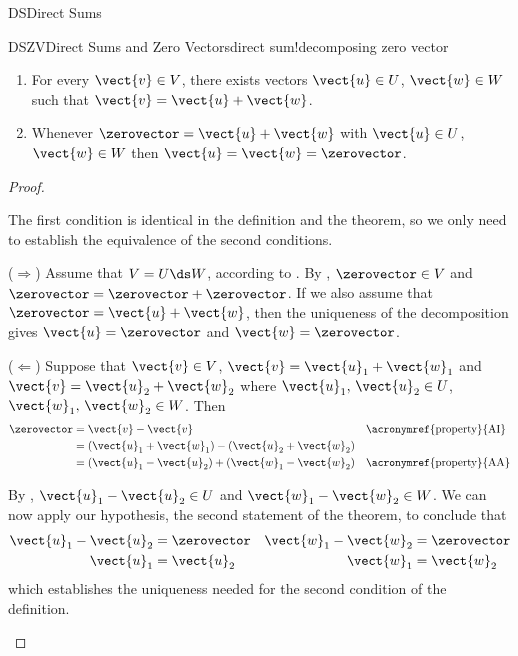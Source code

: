 \begin{subsect}{DS}{Direct Sums}
\begin{theorem}{DSZV}{Direct Sums and Zero Vectors}{direct sum!decomposing zero vector}
\begin{para}
\begin{enumerate}
\item  For every $\vect{v}\in V$, there exists vectors $\vect{u}\in U$, $\vect{w}\in W$ such that $\vect{v}=\vect{u}+\vect{w}$.
%
\item Whenever $\zerovector=\vect{u}+\vect{w}$ with $\vect{u}\in U$, $\vect{w}\in W$ then $\vect{u}=\vect{w}=\zerovector$.
\end{enumerate}
\end{para}
\end{theorem}
%
\begin{proof}
\begin{para}The first condition is identical in the definition and the theorem, so we only need to establish the equivalence of the second conditions.\end{para}
%
\begin{para}($\Rightarrow$)
Assume that $V=U\ds W$, according to .   By , $\zerovector\in V$ and $\zerovector=\zerovector+\zerovector$.  If we also assume that $\zerovector=\vect{u}+\vect{w}$, then the uniqueness of the decomposition gives $\vect{u}=\zerovector$ and $\vect{w}=\zerovector$.\end{para}
%
\begin{para}($\Leftarrow$)
Suppose that $\vect{v}\in V$, $\vect{v}=\vect{u}_1+\vect{w}_1$ and $\vect{v}=\vect{u}_2+\vect{w}_2$ where $\vect{u}_1,\,\vect{u}_2\in U$, $\vect{w}_1,\,\vect{w}_2\in W$.  Then
%
\begin{align*}
\zerovector
&=\vect{v}-\vect{v}&&\text{\acronymref{property}{AI}}\\
&=\left(\vect{u}_1+\vect{w}_1\right)-\left(\vect{u}_2+\vect{w}_2\right)\\
&=\left(\vect{u}_1-\vect{u}_2\right)+\left(\vect{w}_1-\vect{w}_2\right)&&\text{\acronymref{property}{AA}}
\end{align*}
\end{para}
%
\begin{para}By , $\vect{u}_1-\vect{u}_2\in U$ and $\vect{w}_1-\vect{w}_2\in W$.  We can now apply our hypothesis, the second statement of the theorem, to conclude that
%
\begin{align*}
\vect{u}_1-\vect{u}_2&=\zerovector & \vect{w}_1-\vect{w}_2&=\zerovector\\
\vect{u}_1&=\vect{u}_2 & \vect{w}_1&=\vect{w}_2\\
\end{align*}
%
which establishes the uniqueness needed for the second condition of the definition.

\end{para}
\end{proof}
\end{subsect}
